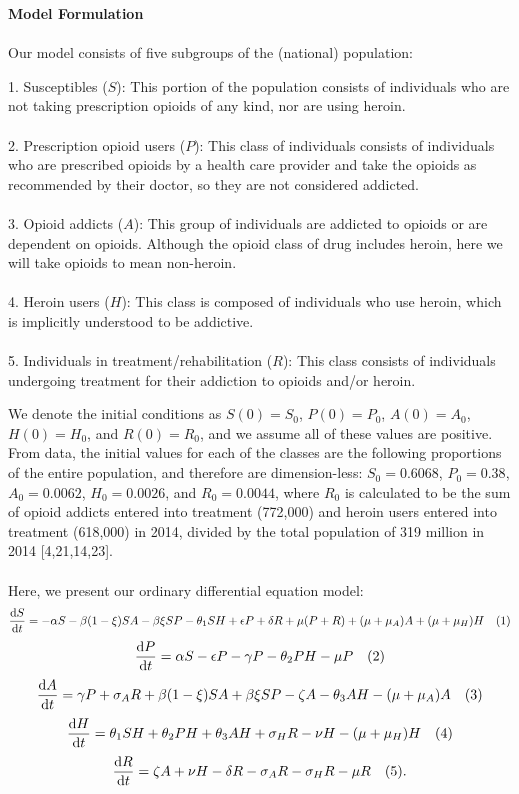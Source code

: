 \documentclass[12pt]{article}
\begin{document}
\textbf{Model Formulation} \\ \\
Our model consists of five subgroups of the (national) population: 

1. Susceptibles ($S$): This portion of the population consists of individuals who are not taking prescription opioids of any kind, nor are using heroin. \\ \\
2. Prescription opioid users ($P$): This class of individuals consists of individuals who are prescribed opioids by a health care provider and take the opioids as recommended by their doctor, so they are not considered addicted. \\ \\
3. Opioid addicts ($A$): This group of individuals are addicted to opioids or are dependent on opioids. Although the opioid class of drug includes heroin, here we will take opioids to mean non-heroin.  \\ \\
4. Heroin users ($H$): This class is composed of individuals who use heroin, which is implicitly understood to be addictive. \\ \\
5. Individuals in treatment/rehabilitation ($R$): This class consists of individuals undergoing treatment for their addiction to opioids and/or heroin. 

We denote the initial conditions as
$S(0)=S_{0}$, $P(0)=P_{0}$, $A(0)=A_{0}$, $H(0)=H_{0}$, and $R(0)=R_{0}$, and we assume all of these values are positive. From data, the initial values for each of the classes are the following proportions of the entire population, and therefore are dimension-less: $S_{0}=0.6068$, $P_{0}=0.38$, $A_{0}=0.0062$, $H_{0}=0.0026$, and $R_{0}=0.0044$, where $R_0$ is calculated to be the sum of opioid addicts entered into treatment (772,000) and heroin users entered into treatment (618,000) in 2014, divided by the total population of 319 million in 2014  [4,21,14,23].  \\ \\
Here, we present our ordinary differential equation model: 
\[\dv{S}{t} = -\alpha S - \beta (1- \xi) SA  -\beta \xi SP- \theta_{1} SH +\epsilon P +\delta R +\mu (P+R) + (\mu+\mu_{A})A + (\mu+\mu_{H}) H \quad (1)\] 
\[\dv{P}{t} = \alpha S - \epsilon P  - \gamma P - \theta_{2}PH- \mu P    \quad(2)\]
\[\dv{A}{t} = \gamma P + \sigma_{A} R +\beta (1- \xi) SA  +\beta \xi SP -\zeta A - \theta_{3}AH-(\mu + \mu_{A})A   \quad (3)\]
\[\dv{H}{t} = \theta_{1}SH+\theta_{2}PH+\theta_{3}AH + \sigma_{H}R-\nu H-(\mu+\mu_{H})H  \quad (4)\]
\[\dv{R}{t} = \zeta A +\nu H -\delta R -\sigma_{A}R-\sigma_{H}R -\mu R\quad(5).\]
\end{document}
